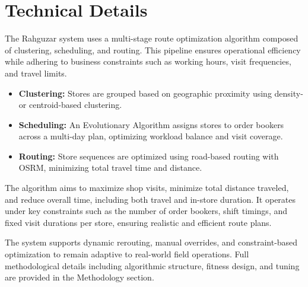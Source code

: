 
\section{Technical Details}

The Rahguzar system uses a multi-stage route optimization algorithm composed of clustering, scheduling, and routing. This pipeline ensures operational efficiency while adhering to business constraints such as working hours, visit frequencies, and travel limits.

\begin{itemize}
    \item \textbf{Clustering:} Stores are grouped based on geographic proximity using density- or centroid-based clustering.
    \item \textbf{Scheduling:} An Evolutionary Algorithm assigns stores to order bookers across a multi-day plan, optimizing workload balance and visit coverage.
    \item \textbf{Routing:} Store sequences are optimized using road-based routing with OSRM, minimizing total travel time and distance.
\end{itemize}
The algorithm aims to maximize shop visits, minimize total distance traveled, and reduce overall time, including both travel and in-store duration. It operates under key constraints such as the number of order bookers, shift timings, and fixed visit durations per store, ensuring realistic and efficient route plans.


The system supports dynamic rerouting, manual overrides, and constraint-based optimization to remain adaptive to real-world field operations. Full methodological details including algorithmic structure, fitness design, and tuning are provided in the Methodology section.
